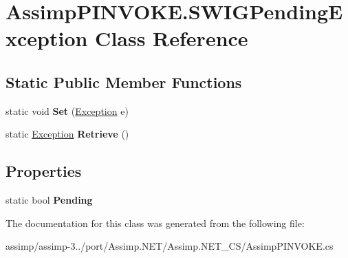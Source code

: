\hypertarget{class_assimp_p_i_n_v_o_k_e_1_1_s_w_i_g_pending_exception}{\section{Assimp\+P\+I\+N\+V\+O\+K\+E.\+S\+W\+I\+G\+Pending\+Exception Class Reference}
\label{class_assimp_p_i_n_v_o_k_e_1_1_s_w_i_g_pending_exception}
}
\subsection*{Static Public Member Functions}
\begin{DoxyCompactItemize}
\item 
\hypertarget{class_assimp_p_i_n_v_o_k_e_1_1_s_w_i_g_pending_exception_acfb4193868e9101f7c58f7f895946801}{static void {\bfseries Set} (\hyperlink{class_exception}{Exception} e)}\label{class_assimp_p_i_n_v_o_k_e_1_1_s_w_i_g_pending_exception_acfb4193868e9101f7c58f7f895946801}

\item 
\hypertarget{class_assimp_p_i_n_v_o_k_e_1_1_s_w_i_g_pending_exception_aa9d85fa8eb1ac88366bf8ad24caad7b3}{static \hyperlink{class_exception}{Exception} {\bfseries Retrieve} ()}\label{class_assimp_p_i_n_v_o_k_e_1_1_s_w_i_g_pending_exception_aa9d85fa8eb1ac88366bf8ad24caad7b3}

\end{DoxyCompactItemize}
\subsection*{Properties}
\begin{DoxyCompactItemize}
\item 
\hypertarget{class_assimp_p_i_n_v_o_k_e_1_1_s_w_i_g_pending_exception_ae5669774a2601ea2f12d3379759afa4d}{static bool {\bfseries Pending}}\label{class_assimp_p_i_n_v_o_k_e_1_1_s_w_i_g_pending_exception_ae5669774a2601ea2f12d3379759afa4d}

\end{DoxyCompactItemize}


The documentation for this class was generated from the following file\+:\begin{DoxyCompactItemize}
\item 
assimp/assimp-\/3../port/\+Assimp.\+N\+E\+T/\+Assimp.\+N\+E\+T\+\_\+\+C\+S/Assimp\+P\+I\+N\+V\+O\+K\+E.\+cs\end{DoxyCompactItemize}
